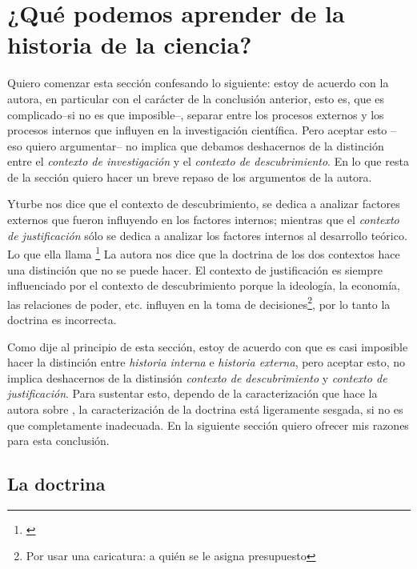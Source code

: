 \section{¿Qué podemos aprender de la historia de la ciencia?}

\noindent Quiero comenzar esta sección confesando lo siguiente: estoy de acuerdo con la autora, en particular con el carácter de la conclusión anterior, esto es, que es complicado--si no es que imposible--, separar entre los procesos externos y los procesos internos que influyen en la investigación científica.
Pero aceptar esto --eso quiero argumentar-- no implica que debamos deshacernos de la distinción entre el \emph{contexto de investigación} y el \emph{contexto de descubrimiento}.
En lo que resta de la sección quiero hacer un breve repaso de los argumentos de la autora.

Yturbe nos dice que el contexto de descubrimiento, se dedica a analizar factores externos que fueron influyendo en los factores internos; mientras que el \emph{contexto de justificación} sólo se dedica a analizar los factores internos al desarrollo teórico.
Lo que ella llama \footnote{
	 \cite[][p. 75]{Yturbe1995}
}
La autora nos dice que la doctrina de los dos contextos hace una distinción que no se puede hacer.
El contexto de justificación es siempre influenciado por el contexto de descubrimiento porque la ideología, la economía, las relaciones de poder, etc. influyen en la toma de decisiones\footnote{Por usar una caricatura: a quién se le asigna presupuesto}, por lo tanto la doctrina es incorrecta.

Como dije al principio de esta sección, estoy de acuerdo con que es casi imposible hacer la distinción entre \emph{historia interna} e \emph{historia externa}, pero aceptar esto, no implica deshacernos de la distinsión \emph{contexto de descubrimiento} y \emph{contexto de justificación}.
Para sustentar esto, dependo de la caracterización que hace la autora sobre , la caracterización de la doctrina está ligeramente sesgada, si no es que completamente inadecuada.
En la siguiente sección quiero ofrecer mis razones para esta conclusión.

\subsection{La doctrina}

